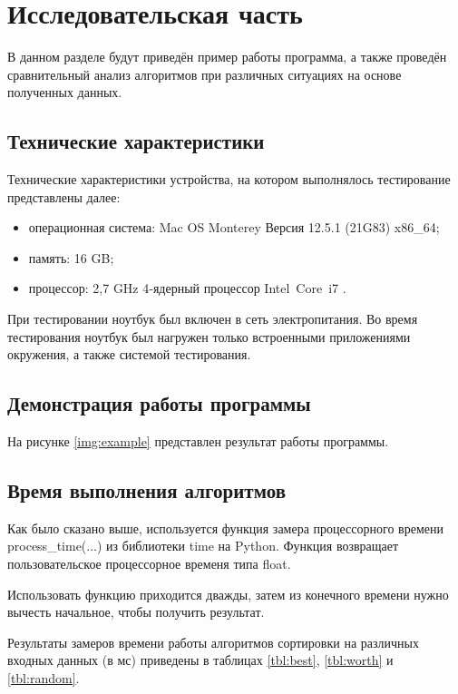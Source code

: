 \chapter{Исследовательская часть}

В данном разделе будут приведён пример работы программа, а также проведён сравнительный анализ алгоритмов при различных ситуациях на основе полученных данных.

\section{Технические характеристики}

Технические характеристики устройства, на котором выполнялось тестирование представлены далее:

\begin{itemize}
	\item операционная система: Mac OS Monterey Версия 12.5.1 (21G83) \cite{macos} x86\_64;
	\item память: 16 GB;
	\item процессор: 2,7 GHz 4‑ядерный процессор Intel Core i7 \cite{intel}.
\end{itemize}

При тестировании ноутбук был включен в сеть электропитания. Во время тестирования ноутбук был нагружен только встроенными приложениями окружения, а также системой тестирования.

\section{Демонстрация работы программы}

На рисунке \ref{img:example} представлен результат работы программы.

\clearpage

\section{Время выполнения алгоритмов}

Как было сказано выше, используется функция замера процессорного времени process\_time(...) из библиотеки time на Python. Функция возвращает пользовательское процессорное временя типа float.

Использовать функцию приходится дважды, затем из конечного времени нужно вычесть начальное, чтобы получить результат.

Результаты замеров времени работы алгоритмов сортировки на различных входных данных (в мс) приведены в таблицах \ref{tbl:best}, \ref{tbl:worth} и \ref{tbl:random}.

